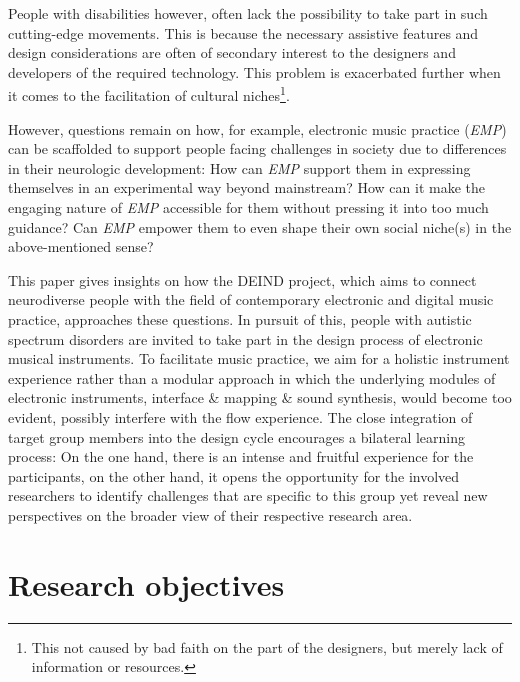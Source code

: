 \documentclass{chi-ext}
\begin{document}
\begin{multicols}{2}

People with disabilities however, often lack the possibility to take part in such cutting-edge movements. This is because the necessary assistive features and design considerations are often of secondary interest to the designers and developers of the required technology. This problem is exacerbated further when it comes to the facilitation of cultural niches\footnote{This  not caused by bad faith on the part of the designers, but merely lack of information or resources.}.

However, questions remain on how, for example, electronic music practice (\emph{EMP}) can be scaffolded to support people facing challenges in society due to differences in their neurologic development:
How can \emph{EMP} support them in expressing themselves in an experimental way beyond mainstream? 
How can it make the engaging nature of \emph{EMP} accessible for them without pressing it into too much guidance?
Can \emph{EMP} empower them to even shape their own social niche(s) in the above-mentioned sense?

This paper gives insights on how the DEIND project, which aims to connect neurodiverse people with the field of contemporary electronic and digital music practice, approaches these questions.
In pursuit of this, people with autistic spectrum disorders are invited to take part in the design process of electronic musical instruments. 
To facilitate music practice, we aim for a holistic instrument experience rather than a modular approach in which the underlying modules of electronic instruments, interface \& mapping \& sound synthesis, would become too evident, possibly interfere with the flow experience. 
The close integration of target group members into the design cycle encourages a bilateral learning process: 
On the one hand, there is an intense and fruitful experience for the participants, on the other hand, it opens the opportunity for the involved researchers to identify challenges that are specific to this group yet reveal new perspectives on the broader view of their respective research area.

\section{Research objectives}
\label{sec:research_objectives}


\end{multicols}
\end{document}
